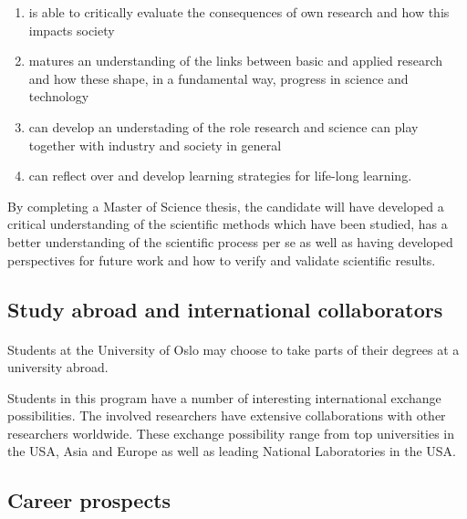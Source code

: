 \documentclass[%
oneside,                 %
final,                   %
10pt]{article}
\begin{document}
\begin{itemize}
\begin{itemize}
\begin{enumerate}
 \item is able to critically evaluate the consequences of own research and how this impacts society

 \item matures an understanding of the links between basic and applied research and how these shape, in a fundamental way,  progress in science and technology

 \item can develop an understading of the role research and science can play together with industry and society in general

 \item can reflect over and develop learning strategies for life-long learning.
\end{enumerate}

\noindent
\end{itemize}

\noindent
\end{itemize}

\noindent
By completing a Master of Science thesis, the candidate will have developed a critical understanding of the scientific methods which have been studied, has a better understanding of the scientific process per se as well as having developed perspectives for future work and how to verify and validate scientific results.

\subsection*{Study abroad and international collaborators}


\paragraph{}

Students at the University of Oslo may choose to take parts of
their degrees at a university abroad.

Students in this program have a number of interesting international
exchange possibilities. The involved researchers have extensive
collaborations with other researchers worldwide. These exchange
possibility range from top universities in the USA, Asia and Europe as
well as leading National Laboratories in the USA.



\subsection*{Career prospects}
\end{document}
